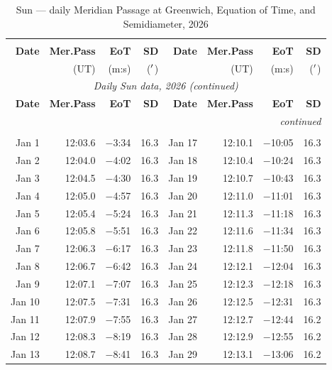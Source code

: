 {\footnotesize
\begin{longtable}{r r r r | r r r r}
\caption{Sun --- daily Meridian Passage at Greenwich, Equation of Time, and Semidiameter, 2026}\label{sundaily}\\
\toprule
\multicolumn{4}{c|}{} & \multicolumn{4}{c}{} \\
\textbf{Date} & \textbf{Mer.Pass} & \textbf{EoT} & \textbf{SD} & \textbf{Date} & \textbf{Mer.Pass} & \textbf{EoT} & \textbf{SD} \\
 & (UT) & (m:s) & (${}^{\prime}$) & & (UT) & (m:s) & (${}^{\prime}$) \\
\midrule
\endfirsthead
\multicolumn{8}{c}{\textit{Daily Sun data, 2026 (continued)}}\\
\toprule
\textbf{Date} & \textbf{Mer.Pass} & \textbf{EoT} & \textbf{SD} & \textbf{Date} & \textbf{Mer.Pass} & \textbf{EoT} & \textbf{SD} \\
\midrule
\endhead
\midrule\multicolumn{8}{r}{\textit{continued}}\\
\endfoot
\bottomrule
\endlastfoot
\multicolumn{8}{l}{\textbf{January 2026}}\\
Jan 1 & 12:03.6 & $-$3:34 & 16.3 & Jan 17 & 12:10.1 & $-$10:05 & 16.3 \\
Jan 2 & 12:04.0 & $-$4:02 & 16.3 & Jan 18 & 12:10.4 & $-$10:24 & 16.3 \\
Jan 3 & 12:04.5 & $-$4:30 & 16.3 & Jan 19 & 12:10.7 & $-$10:43 & 16.3 \\
Jan 4 & 12:05.0 & $-$4:57 & 16.3 & Jan 20 & 12:11.0 & $-$11:01 & 16.3 \\
Jan 5 & 12:05.4 & $-$5:24 & 16.3 & Jan 21 & 12:11.3 & $-$11:18 & 16.3 \\
Jan 6 & 12:05.8 & $-$5:51 & 16.3 & Jan 22 & 12:11.6 & $-$11:34 & 16.3 \\
Jan 7 & 12:06.3 & $-$6:17 & 16.3 & Jan 23 & 12:11.8 & $-$11:50 & 16.3 \\
Jan 8 & 12:06.7 & $-$6:42 & 16.3 & Jan 24 & 12:12.1 & $-$12:04 & 16.3 \\
Jan 9 & 12:07.1 & $-$7:07 & 16.3 & Jan 25 & 12:12.3 & $-$12:18 & 16.3 \\
Jan 10 & 12:07.5 & $-$7:31 & 16.3 & Jan 26 & 12:12.5 & $-$12:31 & 16.3 \\
Jan 11 & 12:07.9 & $-$7:55 & 16.3 & Jan 27 & 12:12.7 & $-$12:44 & 16.2 \\
Jan 12 & 12:08.3 & $-$8:19 & 16.3 & Jan 28 & 12:12.9 & $-$12:55 & 16.2 \\
Jan 13 & 12:08.7 & $-$8:41 & 16.3 & Jan 29 & 12:13.1 & $-$13:06 & 16.2 \\

\end{longtable}}
